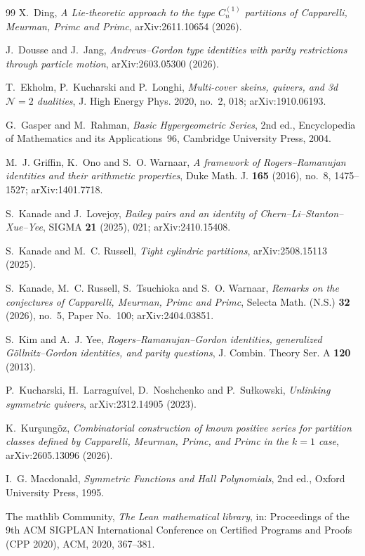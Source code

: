 \documentclass[11pt]{amsart}
\theoremstyle{definition}
\numberwithin{equation}{section}
\begin{document}
\begin{thebibliography}{99}
 X.~Ding, \emph{A Lie-theoretic approach to the type $C_n^{(1)}$ partitions of
Capparelli, Meurman, Primc and Primc}, arXiv:2611.10654 (2026).

 J.~Dousse and J.~Jang, \emph{Andrews--Gordon type identities with parity restrictions
through particle motion}, arXiv:2603.05300 (2026).

 T.~Ekholm, P.~Kucharski and P.~Longhi, \emph{Multi-cover skeins, quivers, and 3d
$\mathcal N=2$ dualities}, J. High Energy Phys. 2020, no.~2, 018; arXiv:1910.06193.

 G.~Gasper and M.~Rahman, \emph{Basic Hypergeometric Series}, 2nd ed., Encyclopedia of
Mathematics and its Applications~96, Cambridge University Press, 2004.

 M.~J. Griffin, K.~Ono and S.~O. Warnaar, \emph{A framework of Rogers--Ramanujan identities
and their arithmetic properties}, Duke Math. J. \textbf{165} (2016), no.~8, 1475--1527; arXiv:1401.7718.

 S.~Kanade and J.~Lovejoy, \emph{Bailey pairs and an identity of
Chern--Li--Stanton--Xue--Yee}, SIGMA \textbf{21} (2025), 021; arXiv:2410.15408.

 S.~Kanade and M.~C. Russell, \emph{Tight cylindric partitions}, arXiv:2508.15113 (2025).

 S.~Kanade, M.~C. Russell, S.~Tsuchioka and S.~O. Warnaar, \emph{Remarks on the
conjectures of Capparelli, Meurman, Primc and Primc}, Selecta Math. (N.S.) \textbf{32} (2026), no.~5,
Paper No.~100; arXiv:2404.03851.

 S.~Kim and A.~J. Yee, \emph{Rogers--Ramanujan--Gordon identities, generalized
G\"ollnitz--Gordon identities, and parity questions}, J. Combin. Theory Ser. A \textbf{120} (2013).

 P.~Kucharski, H.~Larragu\'ivel, D.~Noshchenko and P.~Su\l kowski, \emph{Unlinking symmetric
quivers}, arXiv:2312.14905 (2023).

 K.~Kur\c{s}ung\"oz, \emph{Combinatorial construction of known positive series for
partition classes defined by Capparelli, Meurman, Primc, and Primc in the $k=1$ case},
arXiv:2605.13096 (2026).

 I.~G. Macdonald, \emph{Symmetric Functions and Hall Polynomials}, 2nd ed., Oxford
University Press, 1995.

 The mathlib Community, \emph{The Lean mathematical library}, in: Proceedings of the 9th
ACM SIGPLAN International Conference on Certified Programs and Proofs (CPP 2020), ACM, 2020, 367--381.


\end{thebibliography}
\end{document}
